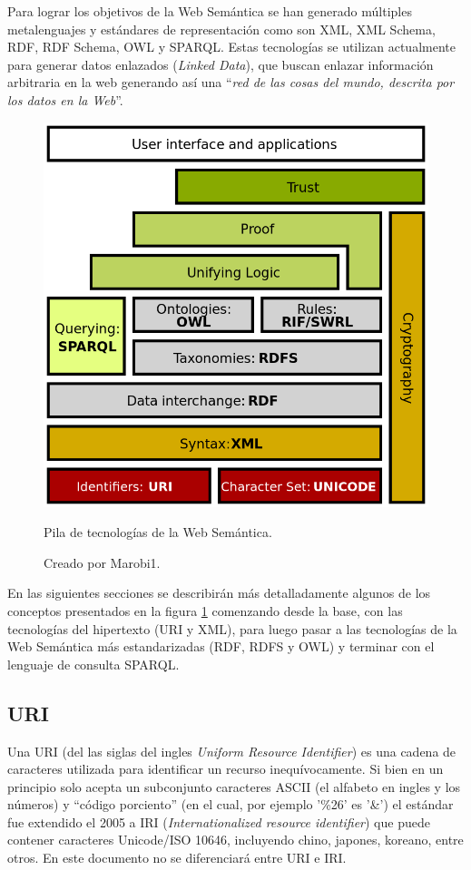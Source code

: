 Para lograr los objetivos de la Web Semántica se han generado múltiples
metalenguajes y estándares de representación como son XML, XML Schema, RDF,
RDF Schema, OWL y SPARQL. Estas tecnologías se utilizan actualmente para generar
datos enlazados (\emph{Linked Data}), que buscan enlazar información arbitraria
en la web generando así una ``\emph{red de las cosas del mundo, descrita por los
datos en la Web}''\cite{berners2011linked}.

\begin{figure}[htpb]
  \centering
  \includegraphics[width=.6\textwidth]{figures/Semantic_web_stack.png}
  \caption{Pila de tecnologías de la Web Semántica.}
  \vspace{-.25cm}
  \caption*{Creado por Marobi1\cite{wikimg:swstack}.}
  \label{fig:swstack}
\end{figure}

En las siguientes secciones se describirán más detalladamente algunos de los
conceptos presentados en la figura \ref{fig:swstack} comenzando desde la base,
con las tecnologías del hipertexto (URI y XML), para luego pasar a las
tecnologías de la Web Semántica más estandarizadas (RDF, RDFS y OWL) y terminar
con el lenguaje de consulta SPARQL.

\subsection{URI}
Una URI (del las siglas del ingles \emph{Uniform Resource Identifier}) es una
cadena de caracteres utilizada para identificar un recurso inequívocamente.
Si bien en un principio solo acepta un subconjunto caracteres ASCII (el alfabeto
en ingles y los números) y ``código porciento'' (en el cual, por ejemplo '\%26'
es '\&') el estándar fue extendido el 2005 a IRI (\emph{Internationalized
resource identifier}) que puede contener caracteres Unicode/ISO 10646,
incluyendo chino, japones, koreano, entre otros\cite{gangemi2006bourne}.
En este documento no se diferenciará entre URI e IRI.

